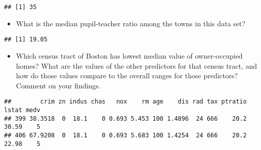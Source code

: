 \documentclass[
]{article}
\newenvironment{Shaded}{\begin{snugshade}}{\end{snugshade}}
\newcommand{\DecValTok}[1]{\textcolor[rgb]{0.00,0.00,0.81}{#1}}
\newcommand{\FunctionTok}[1]{\textcolor[rgb]{0.00,0.00,0.00}{#1}}
\newcommand{\NormalTok}[1]{#1}
\newcommand{\SpecialCharTok}[1]{\textcolor[rgb]{0.00,0.00,0.00}{#1}}
\providecommand{\tightlist}{%
  \setlength{\itemsep}{0pt}\setlength{\parskip}{0pt}}
\begin{document}
\begin{Shaded}
\end{Shaded}

\begin{verbatim}
## [1] 35
\end{verbatim}

\begin{itemize}
\tightlist
\item
  What is the median pupil-teacher ratio among the towns in this data
  set?
\end{itemize}

\begin{Shaded}
\end{Shaded}

\begin{verbatim}
## [1] 19.05
\end{verbatim}

\begin{itemize}
\tightlist
\item
  Which census tract of Boston has lowest median value of owner-occupied
  homes? What are the values of the other predictors for that census
  tract, and how do those values compare to the overall ranges for those
  predictors? Comment on your findings.
\end{itemize}

\begin{Shaded}
\end{Shaded}

\begin{verbatim}
##        crim zn indus chas   nox    rm age    dis rad tax ptratio lstat medv
## 399 38.3518  0  18.1    0 0.693 5.453 100 1.4896  24 666    20.2 30.59    5
## 406 67.9208  0  18.1    0 0.693 5.683 100 1.4254  24 666    20.2 22.98    5
\end{verbatim}
\end{document}
